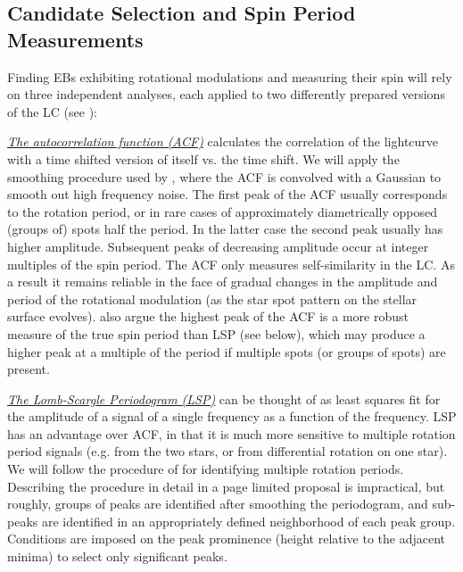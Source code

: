 \subsection{Candidate Selection and Spin Period Measurements}
%
\label{sec:spin_search_and_measurement}

Finding EBs exhibiting rotational modulations and measuring their spin will rely
on three independent analyses, each applied to two differently prepared versions
of the LC (see ):

\textit{\underline{The autocorrelation function (ACF)}} calculates the
correlation of the lightcurve with a time shifted version of itself vs. the time
shift. We will apply the smoothing procedure used by \citep{McQuillan_et_al_13,
Lurie_et_al_17}, where the ACF is convolved with a Gaussian to smooth out high
frequency noise. The first peak of the ACF usually corresponds to the rotation
period, or in rare cases of approximately diametrically opposed (groups of)
spots half the period. In the latter case the second peak usually has higher
amplitude. Subsequent peaks of decreasing amplitude occur at integer multiples
of the spin period. The ACF only measures self-similarity in the LC. As a result
it remains reliable in the face of gradual changes in the amplitude and period
of the rotational modulation (as the star spot pattern on the stellar surface
evolves).  \citep{McQuillan_et_al_13} also argue the highest peak of the ACF is
a more robust measure of the true spin period than LSP (see below), which may
produce a higher peak at a multiple of the period if multiple spots (or groups
of spots) are present.

\textit{\underline{The Lomb-Scargle Periodogram (LSP)}} can be thought of as
least squares fit for the amplitude of a signal of a single frequency as a
function of the frequency. LSP has an advantage over ACF, in that it is much
more sensitive to multiple rotation period signals (e.g. from the two stars, or
from differential rotation on one star). We will follow the procedure of
\citep{Rappaport_et_al_14, Lurie_et_al_17} for identifying multiple rotation
periods. Describing the procedure in detail in a page limited proposal is
impractical, but roughly, groups of peaks are identified after smoothing the
periodogram, and sub-peaks are identified in an appropriately defined
neighborhood of each peak group. Conditions are imposed on the peak prominence
(height relative to the adjacent minima) to select only significant peaks.

